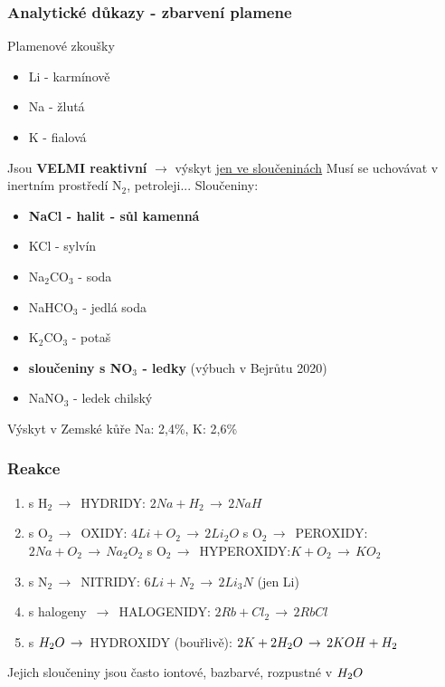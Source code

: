     \subsubsection{Analytické důkazy - zbarvení plamene}
        Plamenové zkoušky
        \begin{itemize}
            \item Li - karmínově
            \item Na - žlutá
            \item K - fialová
        \end{itemize}
    Jsou \textbf{VELMI reaktivní} $\rightarrow$ výskyt \underline{jen ve sloučeninách}
    Musí se uchovávat v inertním prostředí N$_2$, petroleji...
    Sloučeniny:
    \begin{itemize}
        \item \textbf{NaCl - halit - sůl kamenná}
        \item KCl - sylvín
        \item Na$_2$CO$_3$ - soda
        \item NaHCO$_3$ - jedlá soda
        \item K$_2$CO$_3$ - potaš
        \item \textbf{sloučeniny s NO$_3$ - ledky} (výbuch v Bejrůtu 2020)
        \item NaNO$_3$ - ledek chilský
    \end{itemize}
    Výskyt v Zemské kůře Na: 2,4\%, K: 2,6\%
    
    \subsubsection{Reakce}
    \begin{enumerate}
        \item s H$_2\,\to\,$ HYDRIDY: \tab $2Na + H_2\,\to\, 2NaH$
        \item s O$_2\,\to\,$ OXIDY: \tab $4Li + O_2\,\to\, 2Li_2O$
            \newline s O$_2\,\to\,$ PEROXIDY:\tab $2Na + O_2\,\to\, Na_2O_2$
            \newline s O$_2\,\to\,$ HYPEROXIDY:\tab $K + O_2\,\to\, KO_2$
        \item s N$_2\,\to\,$ NITRIDY: \tab $6Li + N_2\,\to\, 2Li_3N$ (jen Li)
        \item s halogeny $\,\to\,$ HALOGENIDY: \tab $2Rb + Cl_2\,\to\, 2RbCl$
        \item s $H_2O \,\to\,$ HYDROXIDY (bouřlivě): \tab $2K + 2H_2O \,\to\, 2KOH + H_2$
    \end{enumerate}
    Jejich sloučeniny jsou často iontové, bazbarvé, rozpustné v $H_2O$

